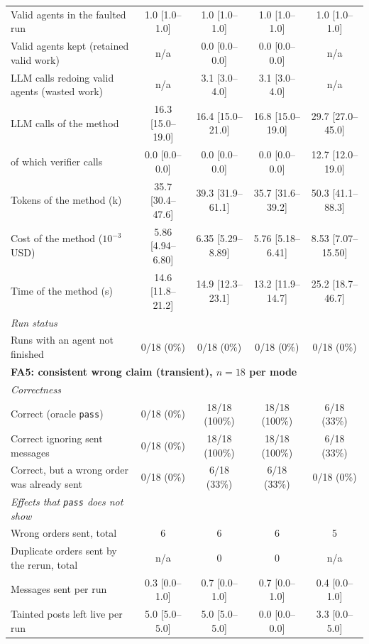 \begin{table}[t]
\begin{tabular}{lcccc}
\qquad Valid agents in the faulted run & 1.0 [1.0--1.0] & 1.0 [1.0--1.0] & 1.0 [1.0--1.0] & 1.0 [1.0--1.0] \\
\qquad Valid agents kept (retained valid work) & n/a & 0.0 [0.0--0.0] & 0.0 [0.0--0.0] & n/a \\
\qquad LLM calls redoing valid agents (wasted work) & n/a & 3.1 [3.0--4.0] & 3.1 [3.0--4.0] & n/a \\
\qquad LLM calls of the method & 16.3 [15.0--19.0] & 16.4 [15.0--21.0] & 16.8 [15.0--19.0] & 29.7 [27.0--45.0] \\
\qquad of which verifier calls & 0.0 [0.0--0.0] & 0.0 [0.0--0.0] & 0.0 [0.0--0.0] & 12.7 [12.0--19.0] \\
\qquad Tokens of the method (k) & 35.7 [30.4--47.6] & 39.3 [31.9--61.1] & 35.7 [31.6--39.2] & 50.3 [41.1--88.3] \\
\qquad Cost of the method ($10^{-3}$ USD) & 5.86 [4.94--6.80] & 6.35 [5.29--8.89] & 5.76 [5.18--6.41] & 8.53 [7.07--15.50] \\
\qquad Time of the method (s) & 14.6 [11.8--21.2] & 14.9 [12.3--23.1] & 13.2 [11.9--14.7] & 25.2 [18.7--46.7] \\
\quad\textit{Run status} & & & & \\
\qquad Runs with an agent not finished & 0/18 (0\%) & 0/18 (0\%) & 0/18 (0\%) & 0/18 (0\%) \\
\midrule
\multicolumn{5}{l}{\textbf{FA5: consistent wrong claim (transient), $n=18$ per mode}} \\
\quad\textit{Correctness} & & & & \\
\qquad Correct (oracle \texttt{pass}) & 0/18 (0\%) & 18/18 (100\%) & 18/18 (100\%) & 6/18 (33\%) \\
\qquad Correct ignoring sent messages & 0/18 (0\%) & 18/18 (100\%) & 18/18 (100\%) & 6/18 (33\%) \\
\qquad Correct, but a wrong order was already sent & 0/18 (0\%) & 6/18 (33\%) & 6/18 (33\%) & 0/18 (0\%) \\
\quad\textit{Effects that \texttt{pass} does not show} & & & & \\
\qquad Wrong orders sent, total & 6 & 6 & 6 & 5 \\
\qquad Duplicate orders sent by the rerun, total & n/a & 0 & 0 & n/a \\
\qquad Messages sent per run & 0.3 [0.0--1.0] & 0.7 [0.0--1.0] & 0.7 [0.0--1.0] & 0.4 [0.0--1.0] \\
\qquad Tainted posts left live per run & 5.0 [5.0--5.0] & 5.0 [5.0--5.0] & 0.0 [0.0--0.0] & 3.3 [0.0--5.0] \\

\end{tabular}
\end{table}
